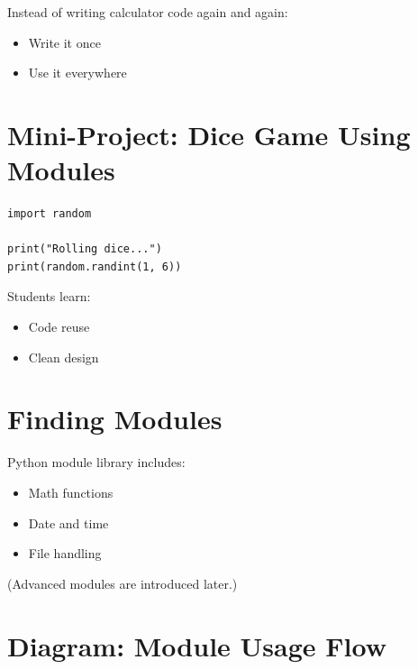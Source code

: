 Instead of writing calculator code again and again:
\begin{itemize}
    \item Write it once
    \item Use it everywhere
\end{itemize}

\section{Mini-Project: Dice Game Using Modules}

\begin{verbatim}
import random

print("Rolling dice...")
print(random.randint(1, 6))
\end{verbatim}

Students learn:
\begin{itemize}
    \item Code reuse
    \item Clean design
\end{itemize}

\section{Finding Modules}

Python module library includes:
\begin{itemize}
    \item Math functions
    \item Date and time
    \item File handling
\end{itemize}

(Advanced modules are introduced later.)

\section{Diagram: Module Usage Flow}

\begin{center}
\end{center}

